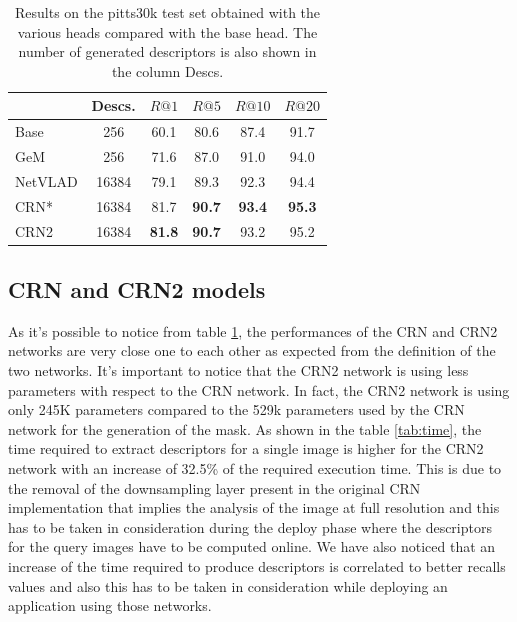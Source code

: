 \documentclass[10pt,twocolumn,letterpaper]{article}
\begin{document}
\begin{table}
   \centering
\begin{tabular}{|l|c|c|c|c|c|}
\hline
         & Descs.&        $R@1$   &        $R@5$   &        $R@10$  &        $R@20$   \\ \hline
Base     & 256   &         60.1   &         80.6   &          87.4   &          91.7   \\
GeM      & 256   &         71.6   &         87.0   &          91.0   &          94.0   \\
NetVLAD  & 16384 &         79.1   &         89.3   &          92.3   &          94.4   \\ \hline
CRN*     & 16384 &         81.7   & \textbf{90.7}  &  \textbf{93.4}  &  \textbf{95.3}  \\
CRN2     & 16384 &\textbf{81.8}   & \textbf{90.7}  &          93.2   &          95.2   \\ \hline
\end{tabular}
\caption{Results on the pitts30k test set obtained with the various heads compared with the base head. The number of generated descriptors 
is also shown in the column Descs.}
\label{tab:base_results}
\end{table}

\subsection{CRN and CRN2 models}
As it's possible to notice from table \ref{tab:base_results}, the performances of the CRN and CRN2 networks are very close one to each other as expected
from the definition of the two networks. It's important to notice that the CRN2 network is using less parameters with respect to the CRN network. In fact,
the CRN2 network is using only 245K parameters compared to the 529k parameters used by the CRN network for the generation of the mask.
As shown in the table \ref{tab:time}, the time required to extract descriptors for a single image is higher for the CRN2 network with an increase of 32.5\% 
of the required execution time. This is due to the removal of the downsampling layer present in the original CRN implementation that implies the analysis of the image 
at full resolution and this 
has to be taken in consideration during the deploy phase where the descriptors for the query images have to be computed online. We have also noticed that an increase
of the time required to produce descriptors is correlated to better recalls values and also this has to be taken in consideration while deploying an 
application using those networks.
\end{document}
